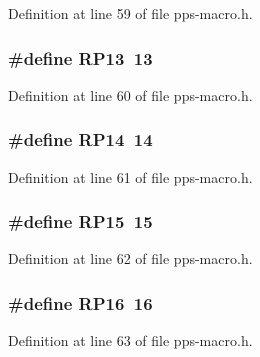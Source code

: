 Definition at line 59 of file pps-\/macro.\+h.

\hypertarget{pps-macro_8h_a7bab6b33de0e4c58f398b10ca9408af1}{}
\subsubsection[{R\+P13}]{\setlength{\rightskip}{0pt plus 5cm}\#define R\+P13~13}\label{pps-macro_8h_a7bab6b33de0e4c58f398b10ca9408af1}


Definition at line 60 of file pps-\/macro.\+h.

\hypertarget{pps-macro_8h_aa92128a7b10f3f7db41cfa54ae312350}{}
\subsubsection[{R\+P14}]{\setlength{\rightskip}{0pt plus 5cm}\#define R\+P14~14}\label{pps-macro_8h_aa92128a7b10f3f7db41cfa54ae312350}


Definition at line 61 of file pps-\/macro.\+h.

\hypertarget{pps-macro_8h_a089c11ee08b44566bbb50b361a8ec46f}{}
\subsubsection[{R\+P15}]{\setlength{\rightskip}{0pt plus 5cm}\#define R\+P15~15}\label{pps-macro_8h_a089c11ee08b44566bbb50b361a8ec46f}


Definition at line 62 of file pps-\/macro.\+h.

\hypertarget{pps-macro_8h_a5cde8ecaee3ceab08a053456bbca849b}{}
\subsubsection[{R\+P16}]{\setlength{\rightskip}{0pt plus 5cm}\#define R\+P16~16}\label{pps-macro_8h_a5cde8ecaee3ceab08a053456bbca849b}


Definition at line 63 of file pps-\/macro.\+h.

\hypertarget{pps-macro_8h_a3c2588a9a0c649079896420de528204a}{}
